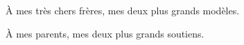 
\begin{dedication}
    À mes très chers frères, mes deux plus grands modèles.

    À mes parents, mes deux plus grands soutiens.
\end{dedication}
